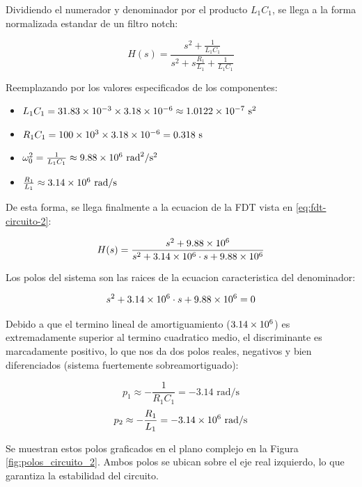 Dividiendo el numerador y denominador por el producto $L_1 C_1$, se llega a la forma normalizada estandar de un filtro notch:

\begin{equation}
  H(s) = \frac{s^2 + \frac{1}{L_1 C_1}}{s^2 + s \frac{R_1}{L_1} + \frac{1}{L_1 C_1}}
  \label{eq:fdt-circuito-2-simb}
\end{equation}

Reemplazando por los valores especificados de los componentes:
\begin{itemize}
  \item $L_1 C_1 = \num{31.83d-3} \times \num{3.18d-6} \approx \num{1.0122d-7} \text{ s}^2$
  \item $R_1 C_1 = \num{100d3} \times \num{3.18d-6} = \num{0.318} \text{ s}$
  \item $\omega_0^2 = \frac{1}{L_1 C_1} \approx \num{9.88d6} \text{ rad}^2/\text{s}^2$
  \item $\frac{R_1}{L_1} \approx \num{3.14d6} \text{ rad/s}$
\end{itemize}

De esta forma, se llega finalmente a la ecuacion de la FDT vista en \ref{eq:fdt-circuito-2}:

\begin{equation}
  H(s) = \frac{s^2 + \num{9.88d6}}{s^2 + \num{3.14d6} \cdot s + \num{9.88d6}}
  \label{eq:fdt-circuito-2}
\end{equation}

Los polos del sistema son las raices de la ecuacion caracteristica del denominador:

\begin{equation}
  s^2 + \num{3.14d6} \cdot s + \num{9.88d6} = 0
\end{equation}

Debido a que el termino lineal de amortiguamiento ($\num{3.14d6}$) es extremadamente superior al termino cuadratico medio, el discriminante es marcadamente positivo, lo que nos da dos polos reales, negativos y bien diferenciados (sistema fuertemente sobreamortiguado):

\begin{equation}
  p_1 \approx -\frac{1}{R_1 C_1} = -\num{3.14} \text{ rad/s}
\end{equation}
\begin{equation}
  p_2 \approx -\frac{R_1}{L_1} = -\num{3.14d6} \text{ rad/s}
\end{equation}

Se muestran estos polos graficados en el plano complejo en la Figura \ref{fig:polos_circuito_2}. Ambos polos se ubican sobre el eje real izquierdo, lo que garantiza la estabilidad del circuito.

